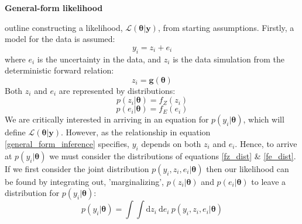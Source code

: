 \begin{tcolorbox}[enhanced jigsaw,breakable,pad at break*=1mm,title=Technical figure 1: General likelihood derivation, title filled,fonttitle=\sffamily\bfseries,fontupper=\sffamily\scriptsize]
\label{Box1}

\begin{multicols}{2}
\textbf{General-form likelihood}

\citet[p.90-92]{gregory2005bayesian} outline constructing a likelihood, $\mathcal{L}(\bm{\theta}|\bm{y})$, from starting assumptions. Firstly, a model for the data is assumed:
\begin{equation}
y_i = z_i + e_i
\label{general_form_inference}
\end{equation}
where $e_i$ is the uncertainty in the data, and $z_i$ is the data simulation from the deterministic forward relation:
\begin{equation}
z_i = \bm{g}(\bm{\theta})
\end{equation}
Both $z_i$ and $e_i$ are represented by distributions:
\begin{equation}
p(z_i|\bm{\theta}) = f_Z(z_i)
\label{fz_dist}
\end{equation}
\begin{equation}
p(e_i|\bm{\theta}) = f_E(e_i)
\label{fe_dist}
\end{equation}
We are critically interested in arriving in an equation for $p(y_i|\bm{\theta})$, which will define $\mathcal{L}(\bm{\theta}|\bm{y})$. However, as the relationship in equation \ref{general_form_inference} specifies, $y_i$ depends on both $z_i$ and $e_i$. Hence, to arrive at $p(y_i|\bm{\theta})$ we must consider the distributions of equations \ref{fz_dist} \& \ref{fe_dist}. If we first consider the joint distribution $p(y_i,z_i,e_i|\bm{\theta})$ then our likelihood can be found by integrating out, 'marginalizing', $p(z_i|\bm{\theta})$ and $p(e_i|\bm{\theta})$ to leave a distribution for $p(y_i|\bm{\theta})$:
\begin{equation}
p(y_i|\bm{\theta}) = \int \int \text{d}z_i\ \text{d}e_i\ p(y_i,z_i,e_i|\bm{\theta})
\label{most_general_L}
\end{equation}

\end{multicols}
\end{tcolorbox}
